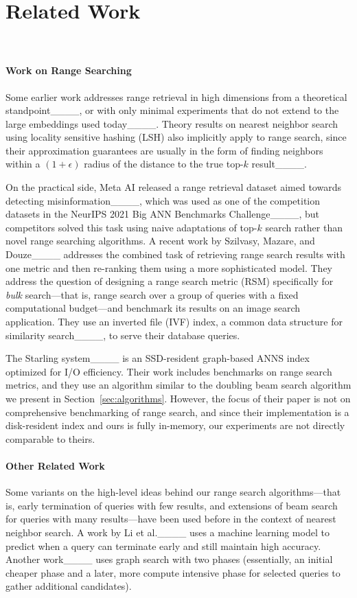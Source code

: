 \section{Related Work}
~\label{sec:relatedwork}

\paragraph{Work on Range Searching} Some earlier work addresses range retrieval in high dimensions from a theoretical standpoint____, or with only minimal experiments that do not extend to the large embeddings used today____. Theory results on nearest neighbor search using locality sensitive hashing (LSH) also implicitly apply to range search, since their approximation guarantees are usually in the form of finding neighbors within a $(1+\epsilon)$ radius of the distance to the true top-$k$ result____.

On the practical side, Meta AI released a range retrieval dataset aimed towards detecting misinformation____, which was used as one of the competition datasets in the NeurIPS 2021 Big ANN Benchmarks Challenge____, but competitors solved this task using naive adaptations of top-$k$ search rather than novel range searching algorithms. A recent work by Szilvasy, Mazare, and Douze____ addresses the combined task of retrieving range search results with one metric and then re-ranking them using a more sophisticated model. They address the question of designing a range search metric (RSM) specifically for \textit{bulk} search---that is, range search over a group of queries with a fixed computational budget---and benchmark its results on an image search application. They use an inverted file (IVF) index, a common data structure for similarity search____, to serve their database queries. 

The Starling system____ is an SSD-resident graph-based ANNS index optimized for I/O efficiency. Their work includes benchmarks on range search metrics, and they use an algorithm similar to the doubling beam search algorithm we present in Section~\ref{sec:algorithms}. However, the focus of their paper is not on comprehensive benchmarking of range search, and since their implementation is a disk-resident index and ours is fully in-memory, our experiments are not directly comparable to theirs. 

\paragraph{Other Related Work} Some variants on the high-level ideas behind our range search algorithms---that is, early termination of queries with few results, and extensions of beam search for queries with many results---have been used before in the context of nearest neighbor search. A work by Li et al.____ uses a machine learning model to predict when a query can terminate early and still maintain high accuracy. Another work____ uses graph search with two phases (essentially, an initial cheaper phase and a later, more compute intensive phase for selected queries to gather additional candidates).